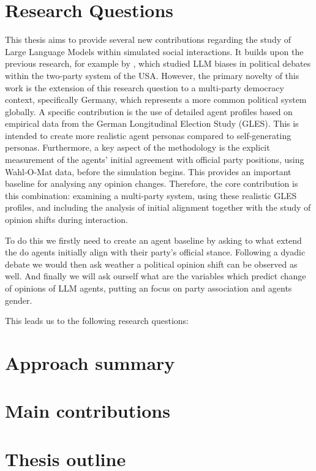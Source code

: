 \section{Research Questions}

This thesis aims to provide several new contributions regarding the study of Large Language Models within simulated social interactions. It builds upon the previous research, for example by \cite{taubenfeld_systematic_2024}, which studied LLM biases in political debates within the two-party system of the USA. However, the primary novelty of this work is the extension of this research question to a multi-party democracy context, specifically Germany, which represents a more common political system globally. A specific contribution is the use of detailed agent profiles based on empirical data from the German Longitudinal Election Study (GLES). This is intended to create more realistic agent personas compared to self-generating personas. Furthermore, a key aspect of the methodology is the explicit measurement of the agents' initial agreement with official party positions, using Wahl-O-Mat data, before the simulation begins. This provides an important baseline for analysing any opinion changes. Therefore, the core contribution is this combination: examining a multi-party system, using these realistic GLES profiles, and including the analysis of initial alignment together with the study of opinion shifts during interaction.

To do this we firstly need to create an agent baseline by asking to what extend the do agents initially align with their party's official stance. Following a dyadic debate we would then ask weather a political opinion shift can be observed as well. And finally we will ask ourself what are the variables which predict change of opinions of LLM agents, putting an focus on party association and agents gender. 

This leads us to the following research questions:



\section{Approach summary}

\section{Main contributions}


\section{Thesis outline}